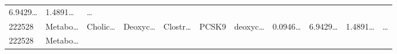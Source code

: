 \documentclass[
]{article}
\begin{document}
\begin{longtable}[]{@{}lllllllllll@{}}
\begin{minipage}[t]{0.07\columnwidth}
6.9429\ldots{}\strut
\end{minipage} & \begin{minipage}[t]{0.07\columnwidth}\raggedright
1.4891\ldots{}\strut
\end{minipage} & \begin{minipage}[t]{0.03\columnwidth}\raggedright
\ldots{}\strut
\end{minipage}\tabularnewline
\begin{minipage}[t]{0.05\columnwidth}\raggedright
222528\strut
\end{minipage} & \begin{minipage}[t]{0.07\columnwidth}\raggedright
Metabo\ldots{}\strut
\end{minipage} & \begin{minipage}[t]{0.07\columnwidth}\raggedright
Cholic\ldots{}\strut
\end{minipage} & \begin{minipage}[t]{0.09\columnwidth}\raggedright
Deoxyc\ldots{}\strut
\end{minipage} & \begin{minipage}[t]{0.07\columnwidth}\raggedright
Clostr\ldots{}\strut
\end{minipage} & \begin{minipage}[t]{0.07\columnwidth}\raggedright
PCSK9\strut
\end{minipage} & \begin{minipage}[t]{0.09\columnwidth}\raggedright
deoxyc\ldots{}\strut
\end{minipage} & \begin{minipage}[t]{0.07\columnwidth}\raggedright
0.0946\ldots{}\strut
\end{minipage} & \begin{minipage}[t]{0.07\columnwidth}\raggedright
6.9429\ldots{}\strut
\end{minipage} & \begin{minipage}[t]{0.07\columnwidth}\raggedright
1.4891\ldots{}\strut
\end{minipage} & \begin{minipage}[t]{0.03\columnwidth}\raggedright
\ldots{}\strut
\end{minipage}\tabularnewline
\begin{minipage}[t]{0.05\columnwidth}\raggedright
222528\strut
\end{minipage} & \begin{minipage}[t]{0.07\columnwidth}\raggedright
Metabo\ldots{}\strut
\end{minipage} & \begin{minipage}[t]{0.07\columnwidth}\raggedright

\end{minipage}
\end{longtable}
\end{document}
